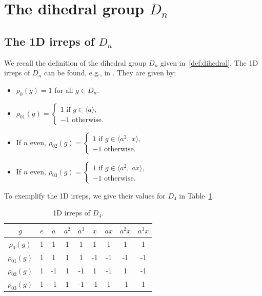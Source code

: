 \documentclass{article}
\theoremstyle{plain}
\theoremstyle{definition}
\theoremstyle{remark}
\begin{document}
\section{The dihedral group $D_n$}
\subsection{The 1D irreps of $D_n$}\label{app:1dirreps}
We recall the definition of the dihedral group $D_n$ given in~\eqref{def:dihedral}. The 1D irreps of $D_n$ can be found, e.g., in \cite{steinberg2011representation}. They are given by:
\begin{itemize}
    \item $\rho_{0}(g)=1$ for all $g\in D_n$.
    \item $\rho_{01}(g)=\begin{cases}
        1 \text{ if } g\in \langle a\rangle,\\
        -1 \text{ otherwise.}
    \end{cases}$
    \item If $n$ even, $\rho_{02}(g)=\begin{cases}
        1 \text{ if } g\in \langle a^2,\ x\rangle,\\
        -1 \text{ otherwise.}
    \end{cases}$
    \item If $n$ even, $\rho_{03}(g)=\begin{cases}
        1 \text{ if } g\in \langle a^2,\ ax\rangle,\\
        -1 \text{ otherwise.}
    \end{cases}$
\end{itemize}
To exemplify the 1D irreps, we give their values for $D_4$ in Table~\ref{tab:1dirreps}.
\begin{table}[H]
    \centering
    \begin{tabular}{|c||c|c|c|c|c|c|c|c|}
        \hline
         $g$&$e$&$a$&$a^2$&$a^3$&$x$&$ax$&$a^2x$&$a^3x$ \\
         \hline
         \hline
         $\rho_{0}(g)$&1&1&1&1&1&1&1&1 \\
         \hline
         $\rho_{01}(g)$&1&1&1&1&-1&-1&-1&-1 \\
         \hline
         $\rho_{02}(g)$&1&-1&1&-1&1&-1&1&-1 \\
         \hline
         $\rho_{03}(g)$&1&-1&1&-1&-1&1&-1&1 \\
         \hline
    \end{tabular}
    \caption{1D irreps of $D_4$.}
    \label{tab:1dirreps}
\end{table}
\end{document}
